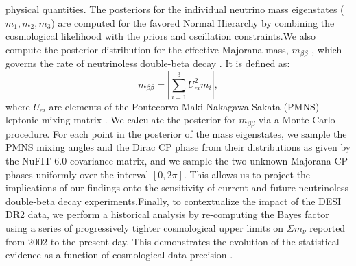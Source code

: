 \documentclass[]{article}
\begin{document}
physical quantities. The posteriors for the individual neutrino mass eigenstates ($m_1, m_2, m_3$) are computed for the favored Normal Hierarchy by combining the cosmological likelihood with the priors and oscillation constraints.We also compute the posterior distribution for the effective Majorana mass, $m_{\beta\beta}$ \citep{benato2015effectivemajoranamassneutrinoless}, which governs the rate of neutrinoless double-beta decay \citep{chakraborty2025highlypredictiveneutrinomodel}. It is defined as:\begin{equation}m_{\beta\beta} = \left| \sum_{i=1}^{3} U_{ei}^2 m_i \right|,\end{equation}where $U_{ei}$ are elements of the Pontecorvo-Maki-Nakagawa-Sakata (PMNS) leptonic mixing matrix  \citep{savla2025classicalreconstructionpmnsmatrix}. We calculate the posterior for $m_{\beta\beta}$ via a Monte Carlo procedure. For each point in the posterior of the mass eigenstates, we sample the PMNS mixing angles and the Dirac CP phase from their distributions as given by the NuFIT 6.0 covariance matrix, and we sample the two unknown Majorana CP phases uniformly over the interval $[0, 2\pi]$. This allows us to project the implications of our findings onto the sensitivity of current and future neutrinoless double-beta decay experiments.Finally, to contextualize the impact of the DESI DR2 data, we perform a historical analysis by re-computing the Bayes factor using a series of progressively tighter cosmological upper limits on $\Sigma m_\nu$ reported from 2002 to the present day. This demonstrates the evolution of the statistical evidence as a function of cosmological data precision  \citep{ong2026bayesianviewdesidr2}.
\end{document}
